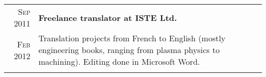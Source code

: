 \documentclass[10pt]{article} %
\begin{document}
\begin{tabular}{r|p{12.5cm}}
%
%

\textsc{Sep 2011} & \textbf{Freelance translator at ISTE Ltd.} \\
\textsc{Feb 2012} & {Translation projects from French to English (mostly engineering books,
ranging from plasma physics to machining). Editing done in Microsoft Word.} \\
\multicolumn{2}{c}{} \\
\end{tabular}




\end{document}
